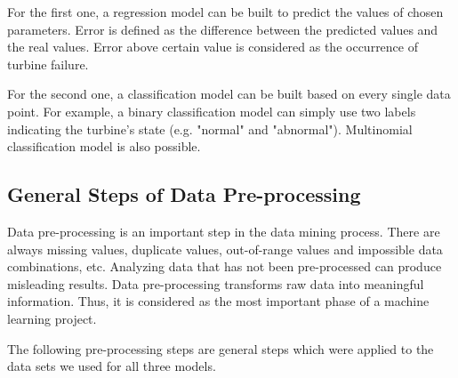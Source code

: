For the first one, a regression model can be built to predict the values of chosen parameters. Error is defined as the difference between the predicted values and the real values. Error above certain value is considered as the occurrence of turbine failure.

For the second one, a classification model can be built based on every single data point. For example, a binary classification model can simply use two labels indicating the turbine's state (e.g. "normal" and "abnormal"). Multinomial classification model is also possible.

\subsection{General Steps of Data Pre-processing}
Data pre-processing is an important step in the data mining process. There are always missing values, duplicate values, out-of-range values and impossible data combinations, etc. Analyzing data that has not been pre-processed can produce misleading results. Data pre-processing transforms raw data into meaningful information. Thus, it is considered as the most important phase of a machine learning project. 

The following pre-processing steps are general steps which were applied to the data sets we used for all three models.

